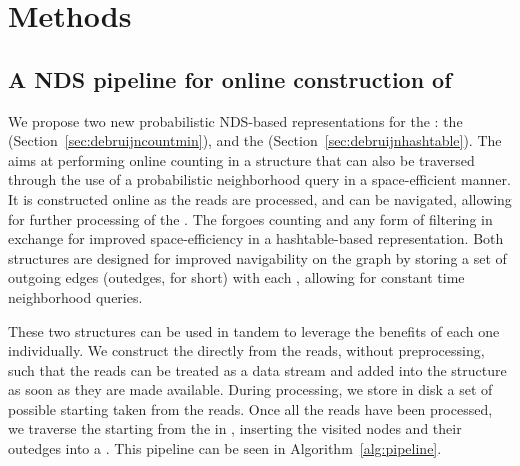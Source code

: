 \chapter{Methods}


\section{A NDS pipeline for online construction of }\label{sec:pipeline}

We propose two new probabilistic NDS-based representations for the \dBG: the \keyterm{\dB \cm} \dBCM (Section~\ref{sec:debruijncountmin}), and the  \dBHT (Section~\ref{sec:debruijnhashtable}). The \dBCM aims at performing online \kmer counting in a structure that can also be traversed through the use of a probabilistic neighborhood query in a space-efficient manner. It is constructed online as the reads are processed, and can be navigated, allowing for further processing of the \dBG. The \dBHT forgoes \kmer counting and any form of filtering in exchange for improved space-efficiency in a hashtable-based representation. Both structures are designed for improved navigability on the graph by storing a set of outgoing edges (outedges, for short) with each \kmer, allowing for constant time neighborhood queries. 

These two structures can be used in tandem to leverage the benefits of each one individually. We construct the \dBCM directly from the reads, without preprocessing, such that the reads can be treated as a data stream and added into the structure as soon as they are made available. During processing, we store in disk a set of possible starting   taken from the reads. Once all the reads have been processed, we traverse the \dBCM starting from the  in , inserting the visited nodes and their outedges into a \dBHT. This pipeline can be seen in Algorithm~\ref{alg:pipeline}.

